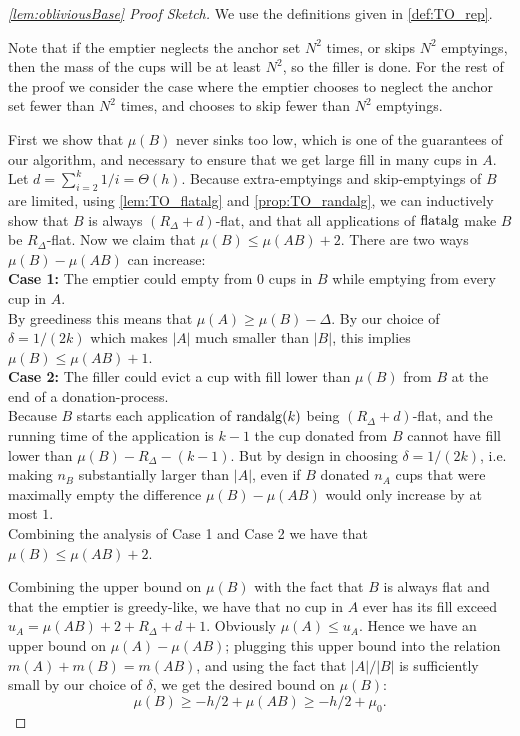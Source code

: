\begin{proof}[\cref{lem:obliviousBase} Proof Sketch] 
  We use the definitions given in \cref{def:TO_rep}.

  Note that if the emptier neglects the anchor set $N^2$ times,
  or skips $N^2$ emptyings, then the mass of the cups will be at
  least $N^2$, so the filler is done. For the rest of the proof
  we consider the case where the emptier chooses to neglect the
  anchor set fewer than $N^2$ times, and chooses to skip fewer
  than $N^2$ emptyings.

First we show that $\mu(B)$ never sinks too low, which is one of
the guarantees of our algorithm, and necessary to ensure that we
get large fill in many cups in $A$. Let $d = \sum_{i=2}^k 1/i =
\Theta(h)$. Because extra-emptyings and skip-emptyings of $B$ are
limited, using \cref{lem:TO_flatalg} and \cref{prop:TO_randalg},
we can inductively show that $B$ is always $(R_\Delta + d)$-flat,
and that all applications of $\operatorname{\text{\textup{flatalg}}}$ make $B$ be
$R_\Delta$-flat. Now we claim that $\mu(B) \le \mu(AB) + 2.$
There are two ways $\mu(B) - \mu(AB)$ can increase:\\
\textbf{Case 1:}
The emptier could empty from $0$ cups in $B$ while emptying
from every cup in $A$. \\
By greediness this means that $\mu(A) \ge \mu(B) - \Delta$. By
our choice of $\delta=1/(2k)$ which makes $|A|$ much
smaller than $|B|$, this implies $\mu(B) \le \mu(AB) + 1$.\\
\textbf{Case 2:}
The filler could evict a cup with fill lower than $\mu(B)$ from
$B$ at the end of a donation-process. \\ Because $B$ starts each
application of $\operatorname{\text{\textup{randalg}}}(k)$ being $(R_\Delta + d)$-flat, and the
running time of the application is $k-1$ the cup donated from $B$
cannot have fill lower than $\mu(B) - R_\Delta - (k-1)$. But
by design in choosing $\delta = 1/(2k)$, i.e. making $n_B$
substantially larger than $|A|$, even if $B$
donated $n_A$ cups that were maximally empty the difference
$\mu(B)-\mu(AB)$ would only increase by at most $1$.\\ Combining
the analysis of Case 1 and Case 2 we have that $\mu(B) \le
\mu(AB) + 2$.

Combining the upper bound on $\mu(B)$ with the fact that $B$ is
always flat and that the emptier is greedy-like, we have that no
cup in $A$ ever has its fill exceed $u_A = \mu(AB) + 2 + R_\Delta
+ d + 1.$ Obviously $\mu(A)\le u_A$. Hence we have an upper bound
on $\mu(A)-\mu(AB)$; plugging this upper bound into the relation
$m(A) + m(B) = m(AB)$, and using the fact that $|A|/|B|$ is
sufficiently small by our choice of $\delta$, we get the
desired bound on $\mu(B)$:
$$\mu(B) \ge -h/2 + \mu(AB) \ge -h/2 + \mu_0.$$


\end{proof}
